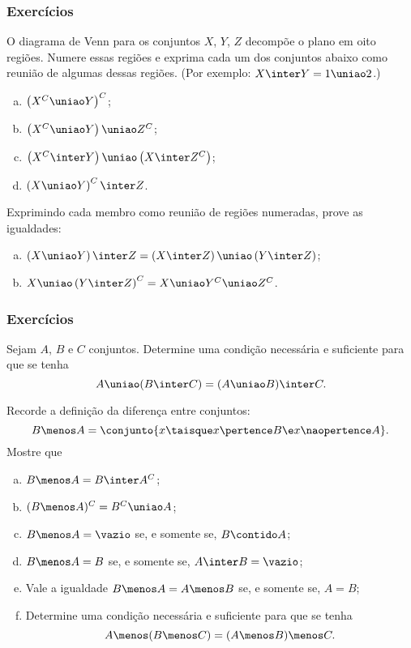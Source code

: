 \begin{frame}
	\frametitle{Exercícios}
	
	\begin{exercicio}
		O diagrama de Venn para os conjuntos $X$, $Y$, $Z$ decompõe o plano em oito regiões. Numere essas regiões e exprima cada um dos conjuntos abaixo como reunião de algumas dessas regiões.  (Por exemplo: $X \inter Y = 1 \uniao 2$.)
		
		\begin{enumerate}[a.]
			\item $\left(X^C \uniao Y \right)^C$;
			\item $\left(X^C \uniao Y \right) \uniao Z^C$;
			\item $\left(X^C \inter Y \right) \uniao \left(X \inter Z^C \right)$;
			\item $\left(X \uniao Y \right)^C \inter Z$.
		\end{enumerate}
	\end{exercicio}

	\begin{exercicio}
		Exprimindo cada membro como reunião de regiões numeradas, prove as igualdades:
		\begin{enumerate}[a.]
			\item $\left(X \uniao Y \right)\inter Z = \left(X \inter Z \right) \uniao \left(Y \inter Z
			\right)$;
			\item $X \uniao \left(Y \inter Z \right)^C = X \uniao Y^C \uniao Z^C$.
		\end{enumerate}
	\end{exercicio}
\end{frame}


\begin{frame}
	\frametitle{Exercícios}
	\begin{exercicio}
		Sejam $A$, $B$ e $C$ conjuntos. Determine uma condição necessária e suficiente para que se tenha
		\[
			A \uniao (B \inter C) = (A \uniao B) \inter C.
		\]
	\end{exercicio}

	\begin{exercicio}
		Recorde a definição da diferença entre conjuntos:
		\[
			B \menos A = \conjunto { x \taisque x \pertence B \e x \naopertence A }.
		\]
		Mostre que
		\begin{enumerate}[a.]
			\item $B \menos A = B \inter A^C$;
			\item $(B \menos A)^C = B^C \uniao A$;
			\item $B \menos A = \vazio$ se, e somente se, $B \contido A$;
			\item $B \menos A = B$ se, e somente se, $A \inter B = \vazio$;
			\item Vale a igualdade $B \menos A = A \menos B$ se, e somente se, $A = B$;
			\item Determine uma condição necessária e suficiente para que se tenha
			\[
				A \menos (B \menos C) = (A \menos B) \menos C.
			\]
		\end{enumerate}
	\end{exercicio}
\end{frame}


